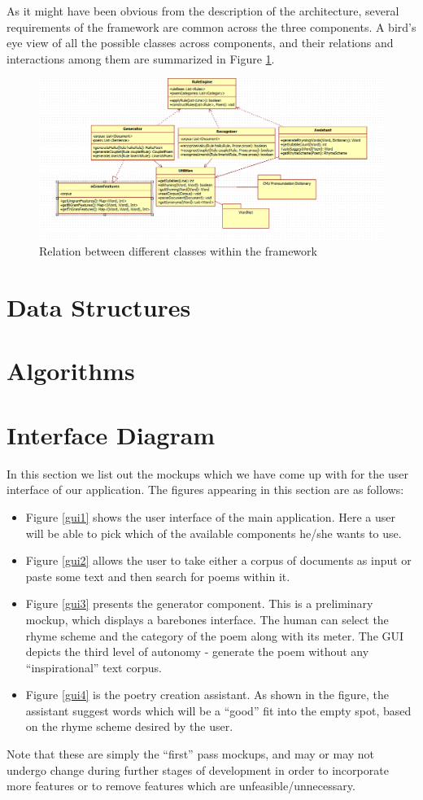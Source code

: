 \documentclass[10pt, letter,twocolumn]{IEEEtran}
\begin{document}
As it might have been obvious from the description of the architecture, several requirements of the framework are common across the three components. A bird's eye view of all the possible classes across components, and their relations and interactions among them are summarized in Figure \ref{class1}.

\begin{figure}[ht]
  \centering
    \includegraphics[scale=0.5]{Images/class1}
    \caption{Relation between different classes within the framework}
  \label{class1}
\end{figure}

\section{Data Structures}
\section{Algorithms}
\section{Interface Diagram}
In this section we list out the mockups which we have come up with for the user interface of our application. The figures appearing in this section are as follows:
\begin{itemize}
\item Figure \ref{gui1} shows the user interface of the main application. Here a user will be able to pick which of the available components he/she wants to use.
\item Figure \ref{gui2} allows the user to take either a corpus of documents as input or paste some text and then search for poems within it.
\item Figure \ref{gui3} presents the generator component. This is a preliminary mockup, which displays a barebones interface. The human can select the rhyme scheme and the category of the poem along with its meter. The GUI depicts the third level of autonomy - generate the poem without any ``inspirational'' text corpus.
\item Figure \ref{gui4} is the poetry creation assistant. As shown in the figure, the assistant suggest words which will be a ``good'' fit into the empty spot, based on the rhyme scheme desired by the user.
\end{itemize}
Note that these are simply the ``first'' pass mockups, and may or may not undergo change during further stages of development in order to incorporate more features or to remove features which are unfeasible/unnecessary.
\end{document}
